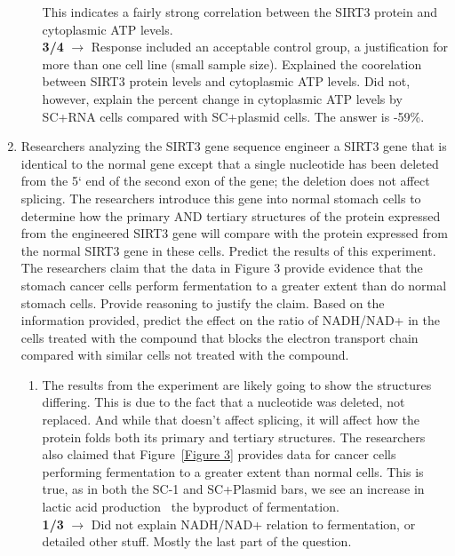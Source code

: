 \documentclass[11pt]{article}
\begin{document}
\begin{enumerate}
\begin{enumerate}
            This indicates a fairly strong correlation between the SIRT3 protein and cytoplasmic ATP levels. \\
            \textbf{3/4} $\rightarrow$ Response included an acceptable control group, a justification for more than one cell line (small sample size).
            Explained the coorelation between SIRT3 protein levels and cytoplasmic ATP levels.
            Did not, however, explain the percent change in cytoplasmic ATP levels by SC+RNA cells compared with SC+plasmid cells.
            The answer is -59\%.
        \end{enumerate}
        \item Researchers analyzing the SIRT3 gene sequence engineer a SIRT3 gene that is identical to the
normal gene except that a single nucleotide has been deleted from the 5` end of the second
exon of the gene; the deletion does not affect splicing. The researchers introduce this gene into
normal stomach cells to determine how the primary AND tertiary structures of the protein
expressed from the engineered SIRT3 gene will compare with the protein expressed from the
normal SIRT3 gene in these cells. Predict the results of this experiment. The researchers claim
that the data in Figure 3 provide evidence that the stomach cancer cells perform fermentation
to a greater extent than do normal stomach cells. Provide reasoning to justify the claim. Based
on the information provided, predict the effect on the ratio of NADH/NAD+ in the cells treated
with the compound that blocks the electron transport chain compared with similar cells not
treated with the compound.
        \begin{enumerate}
            \item The results from the experiment are likely going to show the structures differing.
            This is due to the fact that a nucleotide was deleted, not replaced.
            And while that doesn't affect splicing, it will affect how the protein folds both its primary and tertiary structures.
            The researchers also claimed that Figure~\ref{Figure 3} provides data for cancer cells performing fermentation to a greater extent than normal cells.
            This is true, as in both the SC-1 and SC+Plasmid bars, we see an increase in lactic acid production \textemdash\ the byproduct of fermentation. \\
            \textbf{1/3} $\rightarrow$ Did not explain NADH/NAD+ relation to fermentation, or detailed other stuff. Mostly the last part of the question.
        \end{enumerate}

\end{enumerate}
\end{document}
